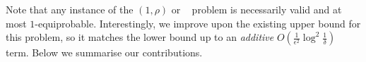 \begin{comment}
To understand the notion of \QPK let us take a concrete example.
We clarify the notion of \QPK via the following example.

\begin{example}
\label{ex:vinvqpk}
Given a set of arms $\A = [0,1]$, such that $\mu_a = a$. Now for some $\gamma \in [0,0.5]$,bwe define a sampling distribution $P_\A^{(\gamma)}$ on $\A$ such that $\Pr_{a \sim P_\A^{(\gamma)}}\{\mu_a \in [0, 0.5]\} = 0.4$, $  \Pr_{a \sim P_\A^{(\gamma)}}\{\mu_a \in (0.5, 0.95] \cup (0.98, 1)\} = 0$, $\Pr_{a \sim P_\A^{(\gamma)}}\{\mu_a (0.95, 0.98]\} = \gamma$, $\Pr_{a \sim P_\A^{(\gamma)}}\{\mu_a = 1\} = 0.6-\gamma$.
\begin{small}
\begin{align*}
&\Pr_{a \sim P_\A^{(\gamma)}}\{0 \leq \mu_a \leq 0.5\} = 0.4,  \Pr_{a \sim P_\A^{(\gamma)}}\{0.5 < \mu_a \leq 0.95\} = 0,\\\nonumber
&\Pr_{a \sim P_\A^{(\gamma)}}\{0.95 < \mu_a < 1\} = \gamma, \Pr_{a \sim P_\A^{(\gamma)}}\{\mu_a = 1\} = 0.6-\gamma. \nonumber
\end{align*}
\end{small}
For $\rho = 0.5$, $k = 2$, $\epsilon = 0.1$, and $\delta \in (0, 1)$, we define 
an instance of  \QPK as $\I^{(\gamma)} \defeq (\A, P_\A^{(\gamma)}, k, \rho, \epsilon, \delta)$. 
Now according to the definition of \QPK, the instance $\I^{(0)}$ is invalid; for 
all $\nu \in (0, 0.1)$ an instance $\I^{(\nu)}$ is invalid, but there exist $k$ 
distinct  $[\epsilon, \rho]$-optimal arms; however, its solution will cease to 
exist for $\epsilon < 0.02$. Therefore, such an instance is not interesting, as 
it may lack existence of arbitrarily close approximate solution. Again for any 
$\gamma > 0.1$, $\I^{(\gamma)}$ is a valid instance; however, as 
$\gamma \downarrow 0.1$, it gets arbitrarily harder to solve $\I^{(\gamma)}$. 
\end{example}
\end{comment}


Note that any instance of the $(1, \rho)$ or \QP~\citep{bib:arcsk2017} problem is necessarily valid and at most $1$-equiprobable. Interestingly, we improve upon the existing  upper bound for this problem, so it matches the lower bound up to an \textit{additive} $O\left(\frac{1}{\epsilon^{2}}\log^2\frac{1}{\delta}\right)$ term. Below we summarise our contributions.


